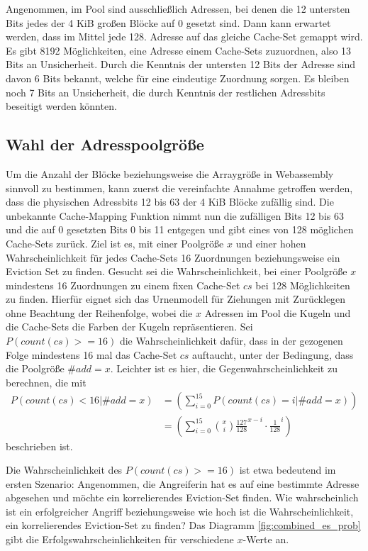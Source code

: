Angenommen, im Pool sind ausschließlich Adressen, bei denen die 12 untersten Bits jedes der 4 KiB großen Blöcke auf 0 gesetzt sind. Dann kann erwartet werden, dass im Mittel jede 128. 
Adresse auf das gleiche Cache-Set gemappt wird. Es gibt 8192 Möglichkeiten, eine Adresse einem Cache-Sets zuzuordnen, also 13 Bits an Unsicherheit.
Durch die Kenntnis der untersten 12 Bits der Adresse sind davon 6 Bits bekannt, welche für eine eindeutige Zuordnung sorgen. 
Es bleiben noch 7 Bits an Unsicherheit, die durch Kenntnis der restlichen Adressbits beseitigt werden könnten.

\subsection{Wahl der Adresspoolgröße}

Um die Anzahl der Blöcke beziehungsweise die Arraygröße in Webassembly sinnvoll zu bestimmen, kann zuerst die vereinfachte Annahme getroffen werden, dass die physischen Adressbits 12 bis 63 der 4 KiB Blöcke zufällig sind. 
Die unbekannte Cache-Mapping Funktion nimmt nun die zufälligen Bits 12 bis 63 und die auf 0 gesetzten Bits 0 bis 11 entgegen und gibt eines von 128 möglichen Cache-Sets zurück.
Ziel ist es, mit einer Poolgröße $x$ und einer hohen Wahrscheinlichkeit für jedes Cache-Sets 16 Zuordnungen beziehungsweise ein Eviction Set zu finden.
Gesucht sei die Wahrscheinlichkeit, bei einer Poolgröße $x$ mindestens 16 Zuordnungen zu einem fixen Cache-Set $cs$ bei 128 Möglichkeiten zu finden.
Hierfür eignet sich das Urnenmodell für Ziehungen mit Zurücklegen ohne Beachtung der Reihenfolge, wobei die $x$ Adressen im Pool die Kugeln und die Cache-Sets die Farben der Kugeln repräsentieren. Sei $P(count(cs)>=16)$ die Wahrscheinlichkeit dafür, dass in der gezogenen Folge mindestens 16 mal das Cache-Set $cs$ auftaucht, unter der Bedingung, dass die Poolgröße $\#add = x$.
Leichter ist es hier, die Gegenwahrscheinlichkeit zu berechnen, die mit
\begin{align*}
P(count(cs)<16|\#add = x) &=
\left( \sum\limits_{i=0}^{15}P(count(cs)=i|\#add = x) \right) \\&=
\left( \sum\limits_{i=0}^{15} {x \choose i} \frac{127}{128}^{x-i} \cdot \frac{1}{128}^i  \right)
\end{align*}
beschrieben ist.

Die Wahrscheinlichkeit des $P(count(cs)>=16)$ ist etwa bedeutend im ersten Szenario:
Angenommen, die Angreiferin hat es auf eine bestimmte Adresse abgesehen und möchte ein korrelierendes Eviction-Set finden. 
Wie wahrscheinlich ist ein erfolgreicher Angriff beziehungsweise wie hoch ist die Wahrscheinlichkeit, ein korrelierendes Eviction-Set zu finden? 
Das Diagramm \ref{fig:combined_es_prob} gibt die Erfolgswahrscheinlichkeiten für verschiedene $x$-Werte an. 

